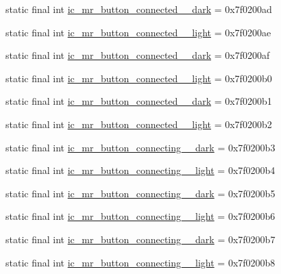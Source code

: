 \begin{CompactItemize}
\item 
static final int \hyperlink{classandroid_1_1support_1_1v7_1_1cardview_1_1_r_1_1drawable_38504f7c4884dff9ae5eed9cc0ed0bb6}{ic\_\-mr\_\-button\_\-connected\_\_\-dark} = 0x7f0200ad
\item 
static final int \hyperlink{classandroid_1_1support_1_1v7_1_1cardview_1_1_r_1_1drawable_64a75e324d38f1363820e8fcbdf910eb}{ic\_\-mr\_\-button\_\-connected\_\_\-light} = 0x7f0200ae
\item 
static final int \hyperlink{classandroid_1_1support_1_1v7_1_1cardview_1_1_r_1_1drawable_0d3be0f9671d8a4107ea060232514337}{ic\_\-mr\_\-button\_\-connected\_\_\-dark} = 0x7f0200af
\item 
static final int \hyperlink{classandroid_1_1support_1_1v7_1_1cardview_1_1_r_1_1drawable_89425c4ecf97f8da6a8606c520846200}{ic\_\-mr\_\-button\_\-connected\_\_\-light} = 0x7f0200b0
\item 
static final int \hyperlink{classandroid_1_1support_1_1v7_1_1cardview_1_1_r_1_1drawable_9f07373d58139dce445c18f43a21552e}{ic\_\-mr\_\-button\_\-connected\_\_\-dark} = 0x7f0200b1
\item 
static final int \hyperlink{classandroid_1_1support_1_1v7_1_1cardview_1_1_r_1_1drawable_15c152781af88916b868e3fc155d5946}{ic\_\-mr\_\-button\_\-connected\_\_\-light} = 0x7f0200b2
\item 
static final int \hyperlink{classandroid_1_1support_1_1v7_1_1cardview_1_1_r_1_1drawable_78e1ddf560400a5c52c4b02020f10467}{ic\_\-mr\_\-button\_\-connecting\_\_\-dark} = 0x7f0200b3
\item 
static final int \hyperlink{classandroid_1_1support_1_1v7_1_1cardview_1_1_r_1_1drawable_2b998a8b65289030e71056328b744393}{ic\_\-mr\_\-button\_\-connecting\_\_\-light} = 0x7f0200b4
\item 
static final int \hyperlink{classandroid_1_1support_1_1v7_1_1cardview_1_1_r_1_1drawable_a82495677d6c33e47097c2962bc4da40}{ic\_\-mr\_\-button\_\-connecting\_\_\-dark} = 0x7f0200b5
\item 
static final int \hyperlink{classandroid_1_1support_1_1v7_1_1cardview_1_1_r_1_1drawable_029fde21060c4e62eccb2b4bfc932717}{ic\_\-mr\_\-button\_\-connecting\_\_\-light} = 0x7f0200b6
\item 
static final int \hyperlink{classandroid_1_1support_1_1v7_1_1cardview_1_1_r_1_1drawable_55d879a7c28cc9257099ee4735b392e0}{ic\_\-mr\_\-button\_\-connecting\_\_\-dark} = 0x7f0200b7
\item 
static final int \hyperlink{classandroid_1_1support_1_1v7_1_1cardview_1_1_r_1_1drawable_aaaa03d3773db75b883a28848f18b7a3}{ic\_\-mr\_\-button\_\-connecting\_\_\-light} = 0x7f0200b8

\end{CompactItemize}

